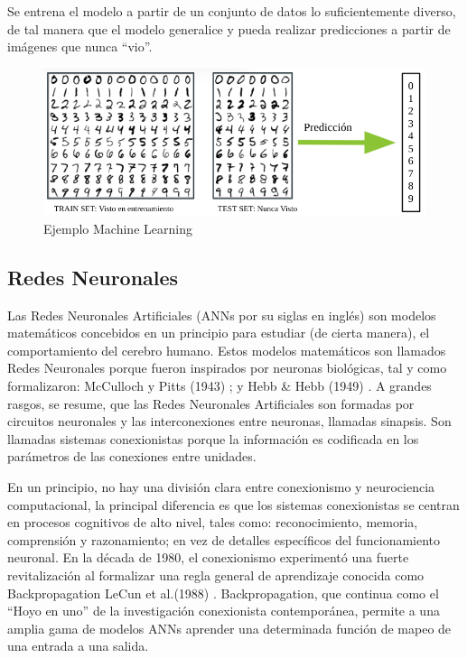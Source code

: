 Se entrena el modelo a partir de un conjunto de datos lo suficientemente diverso, de tal manera que el modelo generalice y pueda realizar predicciones a partir de imágenes que nunca ``vio''.

\begin{figure}[h!]
    \centering
    \includegraphics[width=1\textwidth]{img/RedNeuronal1.png}
    \caption{Ejemplo Machine Learning}
    \label{fig:red neuronal 1}
\end{figure}

\subsection{Redes Neuronales}
Las Redes Neuronales Artificiales (ANNs por su siglas en inglés) son modelos matemáticos concebidos en un principio para estudiar (de cierta manera), el comportamiento del cerebro humano.
Estos modelos matemáticos son llamados Redes Neuronales porque fueron inspirados por neuronas biológicas, tal y como formalizaron: McCulloch y Pitts (1943) \cite{McCulloch1943-nf}; y Hebb & Hebb (1949) \cite{Morris1999-xd}. A grandes rasgos, se resume, que las Redes Neuronales Artificiales son formadas por circuitos neuronales y las interconexiones entre neuronas, llamadas sinapsis. Son llamadas sistemas conexionistas porque la información es codificada en los parámetros de las conexiones entre unidades.

En un principio, no hay una división clara entre conexionismo y neurociencia computacional, la principal diferencia es que los sistemas conexionistas se centran en procesos cognitivos de alto nivel, tales como: reconocimiento, memoria, comprensión  y razonamiento; en vez de detalles específicos del funcionamiento neuronal. En la década de 1980, el conexionismo experimentó una fuerte revitalización al formalizar una regla general de aprendizaje conocida como Backpropagation LeCun et al.(1988) \cite{lecun}. Backpropagation, que continua como el ``Hoyo en uno'' de la investigación conexionista contemporánea, permite a una amplia gama de modelos ANNs aprender una determinada función de mapeo de una entrada a una salida.

